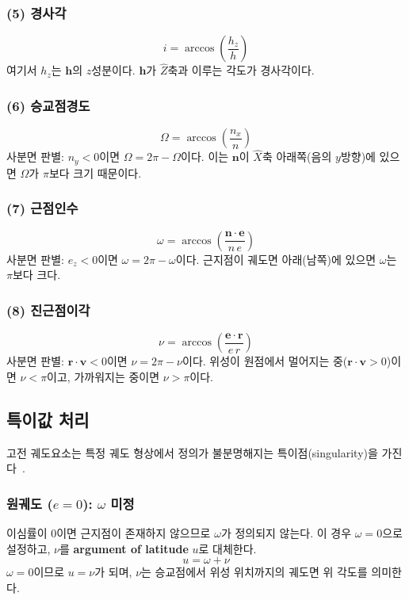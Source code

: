\documentclass[11pt]{article}
\begin{document}
\subsubsection*{(5) 경사각}
\[
  i = \arccos\left(\frac{h_z}{h}\right)
\]
여기서 $h_z$는 $\mathbf{h}$의 $z$성분이다. $\mathbf{h}$가 $\hat{Z}$축과 이루는 각도가 경사각이다.

\subsubsection*{(6) 승교점경도}
\[
  \Omega = \arccos\left(\frac{n_x}{n}\right)
\]
사분면 판별: $n_y < 0$이면 $\Omega = 2\pi - \Omega$이다. 이는 $\mathbf{n}$이 $\hat{X}$축 아래쪽(음의 $y$방향)에 있으면 $\Omega$가 $\pi$보다 크기 때문이다.

\subsubsection*{(7) 근점인수}
\[
  \omega = \arccos\left(\frac{\mathbf{n} \cdot \mathbf{e}}{n \, e}\right)
\]
사분면 판별: $e_z < 0$이면 $\omega = 2\pi - \omega$이다. 근지점이 궤도면 아래(남쪽)에 있으면 $\omega$는 $\pi$보다 크다.

\subsubsection*{(8) 진근점이각}
\[
  \nu = \arccos\left(\frac{\mathbf{e} \cdot \mathbf{r}}{e \, r}\right)
\]
사분면 판별: $\mathbf{r} \cdot \mathbf{v} < 0$이면 $\nu = 2\pi - \nu$이다. 위성이 원점에서 멀어지는 중($\mathbf{r} \cdot \mathbf{v} > 0$)이면 $\nu < \pi$이고, 가까워지는 중이면 $\nu > \pi$이다.

\subsection{특이값 처리}

고전 궤도요소는 특정 궤도 형상에서 정의가 불분명해지는 특이점(singularity)을 가진다~\cite{Vallado2013}.

\subsubsection{원궤도 ($e = 0$): $\omega$ 미정}

이심률이 0이면 근지점이 존재하지 않으므로 $\omega$가 정의되지 않는다. 이 경우 $\omega = 0$으로 설정하고, $\nu$를 \textbf{argument of latitude} $u$로 대체한다.
\[
  u = \omega + \nu
\]
$\omega = 0$이므로 $u = \nu$가 되며, $\nu$는 승교점에서 위성 위치까지의 궤도면 위 각도를 의미한다.
\end{document}
